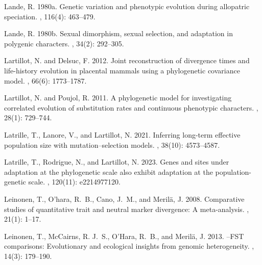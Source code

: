 \documentclass{article}
\begin{document}
\begin{thebibliography}{}
    Lande, R. 1980a.
    \newblock Genetic variation and phenotypic evolution during allopatric
    speciation.
    , {116}(4): 463--479.

    Lande, R. 1980b.
    \newblock Sexual dimorphism, sexual selection, and adaptation in polygenic
    characters.
    , {34}(2): 292--305.

    Lartillot, N. and Delsuc, F. 2012.
    \newblock Joint reconstruction of divergence times and life-history evolution
    in placental mammals using a phylogenetic covariance model.
    , {66}(6): 1773--1787.

    Lartillot, N. and Poujol, R. 2011.
    \newblock A phylogenetic model for investigating correlated evolution of
    substitution rates and continuous phenotypic characters.
    , {28}(1): 729--744.

    Latrille, T., Lanore, V., and Lartillot, N. 2021.
    \newblock Inferring long-term effective population size with
    mutation--selection models.
    , {38}(10): 4573--4587.

    Latrille, T., Rodrigue, N., and Lartillot, N. 2023.
    \newblock Genes and sites under adaptation at the phylogenetic scale also
    exhibit adaptation at the population-genetic scale.
    , {120}(11): e2214977120.

    Leinonen, T., O'hara, R.~B., Cano, J.~M., and Meril{\"a}, J. 2008.
    \newblock Comparative studies of quantitative trait and neutral marker
    divergence: A meta-analysis.
    , {21}(1): 1--17.

    Leinonen, T., McCairns, R. J.~S., O'Hara, R.~B., and Meril{\"a}, J. 2013.
    --{{FST}} comparisons: Evolutionary and ecological insights
    from genomic heterogeneity.
    , {14}(3): 179--190.


\end{thebibliography}
\end{document}
